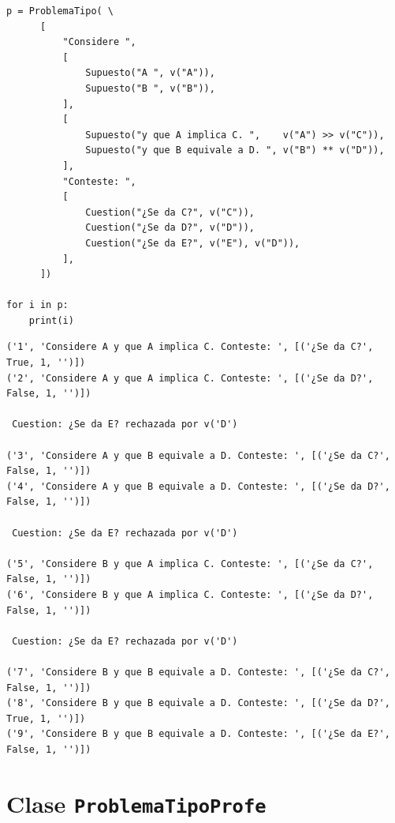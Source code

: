 \documentclass[10pt,a4paper]{report}
\begin{document}
\begin{verbatim}
p = ProblemaTipo( \
      [
          "Considere ",
          [
              Supuesto("A ", v("A")),
              Supuesto("B ", v("B")),
          ],
          [
              Supuesto("y que A implica C. ",    v("A") >> v("C")),
              Supuesto("y que B equivale a D. ", v("B") ** v("D")),
          ],
          "Conteste: ",
          [
              Cuestion("¿Se da C?", v("C")),
              Cuestion("¿Se da D?", v("D")),
              Cuestion("¿Se da E?", v("E"), v("D")),
          ],
      ])
    
for i in p:
    print(i)
\end{verbatim}

\label{}
\begin{verbatim}
('1', 'Considere A y que A implica C. Conteste: ', [('¿Se da C?', True, 1, '')])
('2', 'Considere A y que A implica C. Conteste: ', [('¿Se da D?', False, 1, '')])

 Cuestion: ¿Se da E? rechazada por v('D')

('3', 'Considere A y que B equivale a D. Conteste: ', [('¿Se da C?', False, 1, '')])
('4', 'Considere A y que B equivale a D. Conteste: ', [('¿Se da D?', False, 1, '')])

 Cuestion: ¿Se da E? rechazada por v('D')

('5', 'Considere B y que A implica C. Conteste: ', [('¿Se da C?', False, 1, '')])
('6', 'Considere B y que A implica C. Conteste: ', [('¿Se da D?', False, 1, '')])

 Cuestion: ¿Se da E? rechazada por v('D')

('7', 'Considere B y que B equivale a D. Conteste: ', [('¿Se da C?', False, 1, '')])
('8', 'Considere B y que B equivale a D. Conteste: ', [('¿Se da D?', True, 1, '')])
('9', 'Considere B y que B equivale a D. Conteste: ', [('¿Se da E?', False, 1, '')])
\end{verbatim}
\section{Clase \texttt{ProblemaTipoProfe}}
\label{sec:org0e4bd8a}
\end{document}
